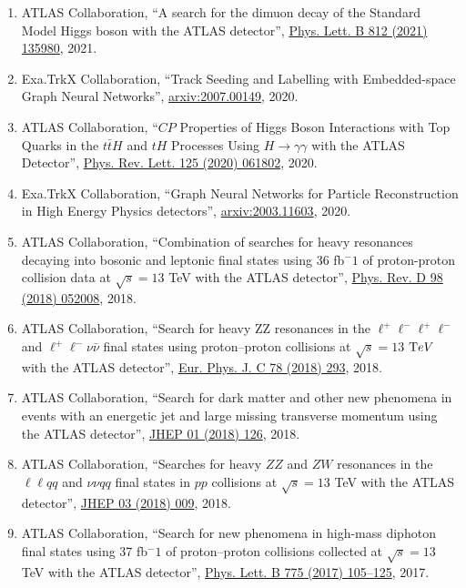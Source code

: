 \begin{enumerate}
\item ATLAS Collaboration, ``A search for the dimuon decay of the Standard Model Higgs boson with the ATLAS detector'', \href{https://doi.org/10.1016/j.physletb.2020.135980}{Phys. Lett. B 812 (2021) 135980}, 2021.
\item Exa.TrkX Collaboration, ``Track Seeding and Labelling with Embedded-space Graph Neural Networks'', \href{https://arxiv.org/abs/2007.00149}{arxiv:2007.00149}, 2020.
\item ATLAS Collaboration, ``$CP$ Properties of Higgs Boson Interactions with Top Quarks in the $t\bar{t}H$ and $tH$ Processes Using $H \to \gamma\gamma$ with the ATLAS Detector'', \href{https://doi.org/10.1103/PhysRevLett.125.061802}{Phys. Rev. Lett. 125 (2020) 061802}, 2020.
\item Exa.TrkX Collaboration, ``Graph Neural Networks for Particle Reconstruction in High Energy Physics detectors'', \href{https://arxiv.org/abs/2003.11603}{arxiv:2003.11603}, 2020.
\item ATLAS Collaboration, ``Combination of searches for heavy resonances decaying into bosonic and leptonic final states using 36  fb$^-1$ of proton-proton collision data at $\sqrt{s} = 13$ TeV with the ATLAS detector'', \href{https://doi.org/10.1103/PhysRevD.98.052008}{Phys. Rev. D 98 (2018) 052008}, 2018.
\item ATLAS Collaboration, ``Search for heavy ZZ resonances in the $\ell ^+\ell ^-\ell ^+\ell ^-$ and $\ell ^+\ell ^-\nu \bar\nu $ final states using proton–proton collisions at $\sqrt{s}= 13$   $\text TeV$ with the ATLAS detector'', \href{https://doi.org/10.1140/epjc/s10052-018-5686-3}{Eur. Phys. J. C 78 (2018) 293}, 2018.
\item ATLAS Collaboration, ``Search for dark matter and other new phenomena in events with an energetic jet and large missing transverse momentum using the ATLAS detector'', \href{https://doi.org/10.1007/JHEP01(2018)126}{JHEP 01 (2018) 126}, 2018.
\item ATLAS Collaboration, ``Searches for heavy $ZZ$ and $ZW$ resonances in the $\ell\ell qq$ and $\nu\nu qq$ final states in $pp$ collisions at $\sqrt{s}=13$ TeV with the ATLAS detector'', \href{https://doi.org/10.1007/JHEP03(2018)009}{JHEP 03 (2018) 009}, 2018.
\item ATLAS Collaboration, ``Search for new phenomena in high-mass diphoton final states using 37 fb$^-1$ of proton--proton collisions collected at $\sqrt{s}=13$ TeV with the ATLAS detector'', \href{https://doi.org/10.1016/j.physletb.2017.10.039}{Phys. Lett. B 775 (2017) 105--125}, 2017.

\end{enumerate}
